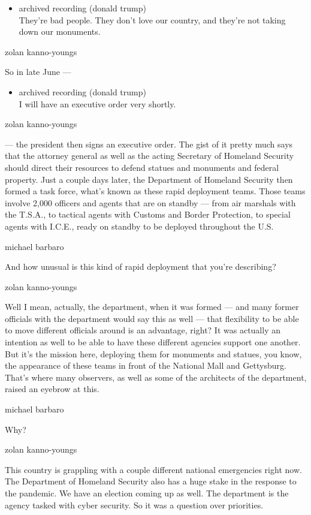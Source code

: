 \begin{itemize}
\tightlist
\item
  archived recording (donald trump)\\
  They're bad people. They don't love our country, and they're not
  taking down our monuments.
\end{itemize}

zolan kanno-youngs

So in late June ---

\begin{itemize}
\tightlist
\item
  archived recording (donald trump)\\
  I will have an executive order very shortly.
\end{itemize}

zolan kanno-youngs

--- the president then signs an executive order. The gist of it pretty
much says that the attorney general as well as the acting Secretary of
Homeland Security should direct their resources to defend statues and
monuments and federal property. Just a couple days later, the Department
of Homeland Security then formed a task force, what's known as these
rapid deployment teams. Those teams involve 2,000 officers and agents
that are on standby --- from air marshals with the T.S.A., to tactical
agents with Customs and Border Protection, to special agents with
I.C.E., ready on standby to be deployed throughout the U.S.

michael barbaro

And how unusual is this kind of rapid deployment that you're describing?

zolan kanno-youngs

Well I mean, actually, the department, when it was formed --- and many
former officials with the department would say this as well --- that
flexibility to be able to move different officials around is an
advantage, right? It was actually an intention as well to be able to
have these different agencies support one another. But it's the mission
here, deploying them for monuments and statues, you know, the appearance
of these teams in front of the National Mall and Gettysburg. That's
where many observers, as well as some of the architects of the
department, raised an eyebrow at this.

michael barbaro

Why?

zolan kanno-youngs

This country is grappling with a couple different national emergencies
right now. The Department of Homeland Security also has a huge stake in
the response to the pandemic. We have an election coming up as well. The
department is the agency tasked with cyber security. So it was a
question over priorities.


